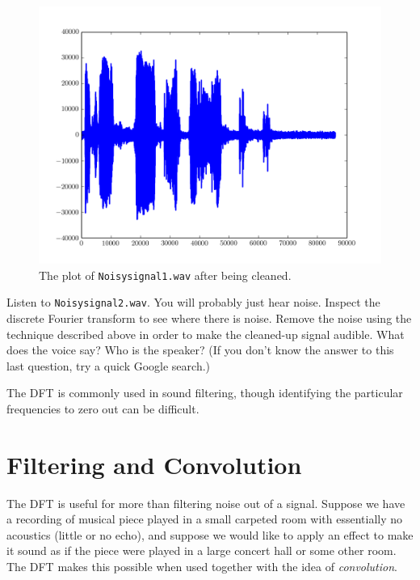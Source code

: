 \begin{figure}
\centering
\includegraphics[width=\textwidth]{figures/Cleanedsignal}
\caption{The plot of \texttt{Noisysignal1.wav} after being cleaned.}
\label{fig:cleansignal}
\end{figure}

\begin{problem}
Listen to \texttt{Noisysignal2.wav}.
You will probably just hear noise.
Inspect the discrete Fourier transform to see where there is noise.
Remove the noise using the technique described above in order to make the cleaned-up signal audible.
What does the voice say?
Who is the speaker?
(If you don't know the answer to this last question, try a quick Google search.)
\end{problem}

The DFT is commonly used in sound filtering, though identifying the particular frequencies to zero out can be difficult.

\section*{Filtering and Convolution}

The DFT is useful for more than filtering noise out of a signal.
Suppose we have a recording of musical piece played in a small carpeted room with essentially no acoustics (little or no echo), and suppose we would like to apply an effect to make it sound as if the piece were played in a large concert hall or some other room.
The DFT makes this possible when used together with the idea of \emph{convolution}.

